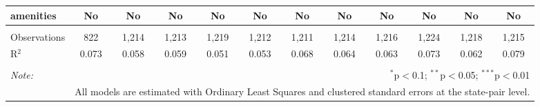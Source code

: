 \begin{table}[!htbp]
\begin{tabular}{@{\extracolsep{5pt}}lccccccccccc}
amenities & No & No & No & No & No & No & No & No & No & No & No \\ 
\hline \\[-1.8ex] 
Observations & 822 & 1,214 & 1,213 & 1,219 & 1,212 & 1,211 & 1,214 & 1,216 & 1,224 & 1,218 & 1,215 \\ 
R$^{2}$ & 0.073 & 0.058 & 0.059 & 0.051 & 0.053 & 0.068 & 0.064 & 0.063 & 0.073 & 0.062 & 0.079 \\ 
\hline 
\hline \\[-1.8ex] 
\textit{Note:}  & \multicolumn{11}{r}{$^{*}$p$<$0.1; $^{**}$p$<$0.05; $^{***}$p$<$0.01} \\ 
 & \multicolumn{11}{r}{All models are estimated with Ordinary Least Squares and clustered standard errors at the state-pair level.} \\ 
\end{tabular} 
\end{table} 
